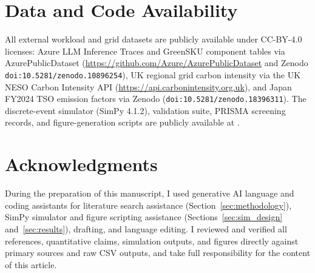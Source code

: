 \section*{Data and Code Availability}
All external workload and grid datasets are publicly available under CC-BY-4.0 licenses: Azure LLM Inference Traces and GreenSKU component tables via AzurePublicDataset (\url{https://github.com/Azure/AzurePublicDataset} and Zenodo \texttt{doi:10.5281/zenodo.10896254}), UK regional grid carbon intensity via the UK NESO Carbon Intensity API (\url{https://api.carbonintensity.org.uk}), and Japan FY2024 TSO emission factors via Zenodo (\texttt{doi:10.5281/zenodo.18396311}). The discrete-event simulator (SimPy 4.1.2), validation suite, PRISMA screening records, and figure-generation scripts are publicly available at \repourl.

\section*{Acknowledgments}
During the preparation of this manuscript, I used generative AI language and coding assistants for literature search assistance (Section~\ref{sec:methodology}), SimPy simulator and figure scripting assistance (Sections~\ref{sec:sim_design} and~\ref{sec:results}), drafting, and language editing. I reviewed and verified all references, quantitative claims, simulation outputs, and figures directly against primary sources and raw CSV outputs, and take full responsibility for the content of this article.
\fi
\fi
